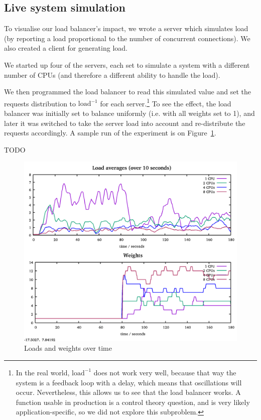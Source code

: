 \documentclass[11pt,oneside,a4paper]{article}
\begin{document}
\subsection{Live system simulation}
To visualise our load balancer's impact, we wrote a server which simulates load
(by reporting a load proportional to the number of concurrent connections).
We also created a client for generating load.

We started up four of the servers, each set to simulate a system with a
different number of CPUs (and therefore a different ability to handle the load).

We then programmed the load balancer to read this simulated value and set the
requests distribution to $\mathrm{load}^{-1}$ for each server.\footnote{%
In the real world, $\mathrm{load}^{-1}$ does not work very well, because that way
the system is a feedback loop with a delay, which means that oscillations will
occur.
Nevertheless, this allows us to see that the load balancer works.
A function usable in production is a control theory question, and is very likely
application-specific, so we did not explore this subproblem.
}
To see the effect, the load balancer was initially set to balance uniformly
(i.e. with all weights set to 1), and later it was switched to take the server
load into account and re-distribute the requests accordingly.
A sample run of the experiment is on Figure~\ref{fig:demo1-wide}.

TODO
\begin{figure}[h]
\centering
\includegraphics[width=.8\textwidth]{figures/demo1-wide.png}
\caption{Loads and weights over time}
\label{fig:demo1-wide}
\end{figure}
\end{document}

